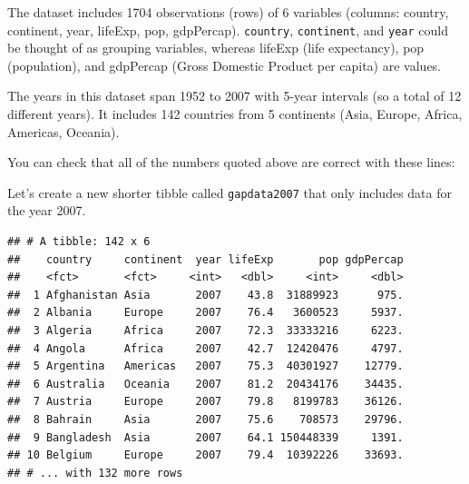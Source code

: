 \documentclass[
  12pt,
  krantz2]{krantz}
\makeatletter
\newenvironment{Shaded}{\begin{snugshade}}{\end{snugshade}}
\newcommand{\DecValTok}[1]{\textcolor[rgb]{0.00,0.00,0.81}{#1}}
\newcommand{\KeywordTok}[1]{\textcolor[rgb]{0.13,0.29,0.53}{\textbf{#1}}}
\newcommand{\NormalTok}[1]{#1}
\newcommand{\OperatorTok}[1]{\textcolor[rgb]{0.81,0.36,0.00}{\textbf{#1}}}
\newcommand{\StringTok}[1]{\textcolor[rgb]{0.31,0.60,0.02}{#1}}
\newenvironment{kframe}{%
\medskip{}
\setlength{\fboxsep}{.8em}
 \def\at@end@of@kframe{}%
 \ifinner\ifhmode%
  \def\at@end@of@kframe{\end{minipage}}%
  \begin{minipage}{\columnwidth}%
 \fi\fi%
 \def\FrameCommand##1{\hskip\@totalleftmargin \hskip-\fboxsep
 \colorbox{shadecolor}{##1}\hskip-\fboxsep
     \hskip-\linewidth \hskip-\@totalleftmargin \hskip\columnwidth}%
 \MakeFramed {\advance\hsize-\width
   \@totalleftmargin\z@ \linewidth\hsize
   \@setminipage}}%
 {\par\unskip\endMakeFramed%
 \at@end@of@kframe}
\renewenvironment{Shaded}{\begin{kframe}}{\end{kframe}}
\makeatother
\begin{document}
The dataset includes 1704 observations (rows) of 6 variables (columns: country, continent, year, lifeExp, pop, gdpPercap).
\texttt{country}, \texttt{continent}, and \texttt{year} could be thought of as grouping variables, whereas lifeExp (life expectancy), pop (population), and gdpPercap (Gross Domestic Product per capita) are values.

The years in this dataset span 1952 to 2007 with 5-year intervals (so a total of 12 different years).
It includes 142 countries from 5 continents (Asia, Europe, Africa, Americas, Oceania).

You can check that all of the numbers quoted above are correct with these lines:

\begin{Shaded}
\end{Shaded}

Let's create a new shorter tibble called \texttt{gapdata2007} that only includes data for the year 2007.

\begin{Shaded}
\end{Shaded}

\begin{verbatim}
## # A tibble: 142 x 6
##    country     continent  year lifeExp       pop gdpPercap
##    <fct>       <fct>     <int>   <dbl>     <int>     <dbl>
##  1 Afghanistan Asia       2007    43.8  31889923      975.
##  2 Albania     Europe     2007    76.4   3600523     5937.
##  3 Algeria     Africa     2007    72.3  33333216     6223.
##  4 Angola      Africa     2007    42.7  12420476     4797.
##  5 Argentina   Americas   2007    75.3  40301927    12779.
##  6 Australia   Oceania    2007    81.2  20434176    34435.
##  7 Austria     Europe     2007    79.8   8199783    36126.
##  8 Bahrain     Asia       2007    75.6    708573    29796.
##  9 Bangladesh  Asia       2007    64.1 150448339     1391.
## 10 Belgium     Europe     2007    79.4  10392226    33693.
## # ... with 132 more rows
\end{verbatim}
\end{document}
